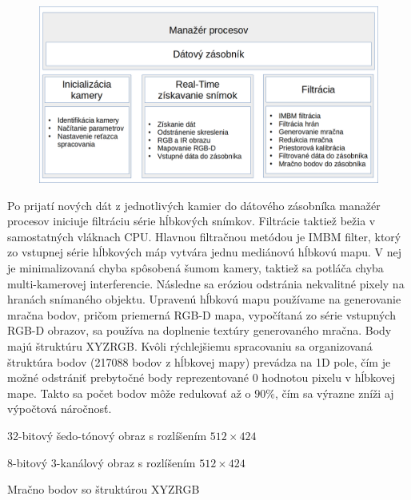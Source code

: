 \begin{figure}[H]
	\centering
	\includegraphics[width=\textwidth]{figures/algorithm_capture.png}
	\caption{}
	\label{fig:algorithm:process:a}
\end{figure}

Po prijatí nových dát z jednotlivých kamier do dátového zásobníka manažér procesov iniciuje filtráciu série hĺbkových snímkov. Filtrácie taktiež bežia v samostatných vláknach CPU. Hlavnou filtračnou metódou je IMBM filter, ktorý zo vstupnej série hĺbkových máp vytvára jednu mediánovú hĺbkovú mapu. V nej je minimalizovaná chyba spôsobená šumom kamery, taktiež sa potláča chyba multi-kamerovej interferencie. Následne sa eróziou odstránia nekvalitné pixely na hranách snímaného objektu. Upravenú hĺbkovú mapu používame na generovanie mračna bodov, pričom priemerná RGB-D mapa, vypočítaná zo série vstupných RGB-D obrazov, sa používa na doplnenie textúry generovaného mračna. Body majú štruktúru XYZRGB. Kvôli rýchlejšiemu spracovaniu sa organizovaná štruktúra bodov (217088 bodov z hĺbkovej mapy) prevádza na 1D pole, čím je možné odstrániť prebytočné body reprezentované 0 hodnotou pixelu v hĺbkovej mape. Takto sa počet bodov môže redukovať až o $90\%$, čím sa výrazne zníži aj výpočtová náročnosť. 

\begin{description}[leftmargin=*, font=$\bullet$~\normalfont\scshape\color{black}]
	\item[Depth median:] 	32-bitový šedo-tónový obraz s rozlíšením $512 \times 424$
	\item[RGB-D median:]	8-bitový 3-kanálový obraz s rozlíšením $512 \times 424$
	\item[Median Point Cloud:] Mračno bodov so štruktúrou XYZRGB 
\end{description}

